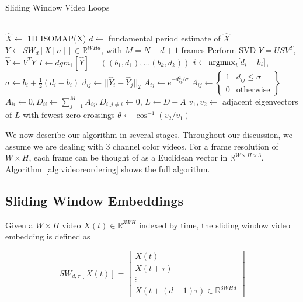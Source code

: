 \documentclass{article}
\newcommand{\argmax}{\operatornamewithlimits{argmax}}
\begin{document}
\begin{algorithm}[t]
  \caption{Sliding Window Video Loops}\label{alg:videoreordering}
  \begin{algorithmic}[1]
     \\
    \State $\hat{X} \gets$ 1D ISOMAP(X)
    \State $d \gets$ fundamental period estimate of $\hat{X}$
    \State $Y \gets SW_{d}[X[n]] \in \mathbb{R}^{WHd}$, with $M = N-d+1$ frames
    \State Perform SVD $Y = USV^T$, $\hat{Y} \gets V^TY$
    \State $I \gets dgm_1[\hat{Y}] = ((b_1, d_1), ... (b_k, d_k))$
    \State $i \gets \argmax_{i}[d_i - b_i]$, $\sigma \gets b_i + \frac{1}{2}(d_i - b_i)$
    \State $d_{ij} \gets ||\hat{Y}_i - \hat{Y}_j||_2$
        \State $A_{ij} \gets e^{-d_{ij}^2/\sigma}$
    \Else
        \State $A_{ij} \gets \left\{ \begin{array}{cc} 1 & d_{ij} \leq \sigma \\ 0 & \text{otherwise} \end{array} \right\}$
    \EndIf
    \State $A_{ii} \gets 0, D_{ii} \gets \sum_{j=1}^M A_{ij}, D_{i, j \neq i} \gets 0$, $L \gets D - A$
    \State $v_1, v_2 \gets $ adjacent eigenvectors of $L$ with fewest zero-crossings
    \State $\theta \gets \cos^{-1}(v_2/v_1)$
    \EndProcedure
  \end{algorithmic}
\end{algorithm}

We now describe our algorithm in several stages.  Throughout our discussion, we assume we are dealing with 3 channel color videos.  For a frame resolution of $W \times H$, each frame can be thought of as a Euclidean vector in $\mathbb{R}^{W \times H \times 3}$.  Algorithm~\ref{alg:videoreordering} shows the full algorithm.

\subsection{Sliding Window Embeddings}
\label{sec:slidingwindow}

Given a $W \times H$ video $X(t) \in \mathbb{R}^{3WH}$ indexed by time, the sliding window video embedding \cite{cao1998dynamics,traliehigh,tralie2017quasi} is defined as

\begin{equation}
SW_{d, \tau}[X(t)] = \left[ \begin{array}{c} X(t) \\ X(t + \tau) \\ \vdots \\ X(t + (d-1)\tau)  \in \mathbb{R}^{3WHd} \end{array} \right]
\end{equation}
\end{document}
